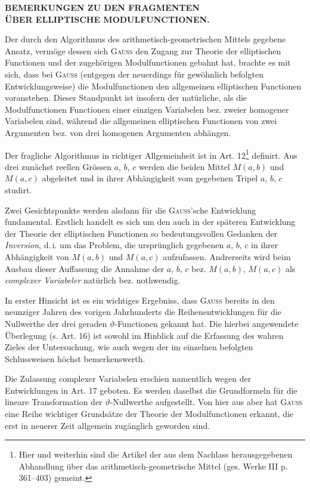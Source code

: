 \enlargethispage{2pt}

\begin{center}\textbf{BEMERKUNGEN ZU DEN FRAGMENTEN\\ ÜBER ELLIPTISCHE MODULFUNCTIONEN.}\end{center}

Der durch den Algorithmus des arithmetisch-geometrischen Mittels gegebene Ansatz, vermöge dessen sich \textsc{Gauss} den Zugang zur Theorie der elliptischen Functionen und der zugehörigen Modulfunctionen gebahnt hat, brachte es mit sich, dass bei \textsc{Gauss} (entgegen der neuerdings für gewöhnlich befolgten Entwicklungsweise) die Modulfunctionen den allgemeinen elliptischen Functionen voranstehen. Dieser Standpunkt ist insofern der natürliche, als die Modulfunctionen Functionen einer einzigen Variabelen bez. zweier homogener Variabelen sind, während die allgemeinen elliptischen Functionen von zwei Argumenten bez. von drei homogenen Argumenten abhängen.

Der fragliche Algorithmus in richtiger Allgemeinheit ist in Art. 12\footnote{Hier und weiterhin sind die Artikel der aus dem Nachlass herausgegebenen Abhandlung über das arithmetisch-geometrische Mittel (ges. Werke III p. 361--403) gemeint.} definirt. Aus drei zunächst reellen Grössen $a$, $b$, $c$ werden die beiden Mittel $M(a,b)$ und $M(a,c)$ abgeleitet und in ihrer Abhängigkeit vom gegebenen Tripel $a$, $b$, $c$ studirt.

Zwei Gesichtspunkte werden alsdann für die \textsc{Gauss}'sche Entwicklung fundamental. Erstlich handelt es sich um den auch in der späteren Entwicklung der Theorie der elliptischen Functionen so bedeutungsvollen Gedanken der \emph{Inversion}, d.\,i. um das Problem, die ursprünglich gegebenen $a$, $b$, $c$ in ihrer Abhängigkeit von $M(a,b)$ und $M(a,c)$ aufzufassen. Andrerseits wird beim Ausbau dieser Auffassung die Annahme der $a$, $b$, $c$ bez. $M(a,b)$, $M(a,c)$ als \emph{complexer Variabeler} natürlich bez. nothwendig.

In erster Hinsicht ist es ein wichtiges Ergebniss, dass \textsc{Gauss} bereits in den neunziger Jahren des vorigen Jahrhunderts die Reihenentwicklungen für die Nullwerthe der drei geraden $\vartheta$-Functionen gekannt hat. Die hierbei angewendete Überlegung (s. Art. 16) ist sowohl im Hinblick auf die Erfassung des wahren Zieles der Untersuchung, wie auch wegen der im einzelnen befolgten Schlussweisen höchst bemerkenswerth.

Die Zulassung complexer Variabelen erschien namentlich wegen der Entwicklungen in Art. 17 geboten. Es werden daselbst die Grundformeln für die lineare Transformation der $\vartheta$-Nullwerthe aufgestellt. Von hier aus aber hat \textsc{Gauss} eine Reihe wichtiger Grundsätze der Theorie der Modulfunctionen erkannt, die erst in neuerer Zeit allgemein zugänglich geworden sind.


